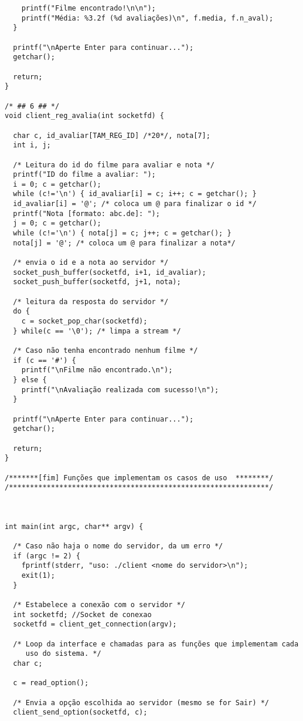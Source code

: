 \documentclass[11pt,twoside]{article}
\begin{document}
\begin{verbatim}
    printf("Filme encontrado!\n\n");
    printf("Média: %3.2f (%d avaliações)\n", f.media, f.n_aval);
  }

  printf("\nAperte Enter para continuar...");
  getchar();

  return;
}

/* ## 6 ## */
void client_reg_avalia(int socketfd) {

  char c, id_avaliar[TAM_REG_ID] /*20*/, nota[7];
  int i, j;

  /* Leitura do id do filme para avaliar e nota */
  printf("ID do filme a avaliar: ");
  i = 0; c = getchar();
  while (c!='\n') { id_avaliar[i] = c; i++; c = getchar(); }
  id_avaliar[i] = '@'; /* coloca um @ para finalizar o id */
  printf("Nota [formato: abc.de]: ");
  j = 0; c = getchar();
  while (c!='\n') { nota[j] = c; j++; c = getchar(); }
  nota[j] = '@'; /* coloca um @ para finalizar a nota*/

  /* envia o id e a nota ao servidor */
  socket_push_buffer(socketfd, i+1, id_avaliar);
  socket_push_buffer(socketfd, j+1, nota);

  /* leitura da resposta do servidor */
  do {
    c = socket_pop_char(socketfd);
  } while(c == '\0'); /* limpa a stream */
  
  /* Caso não tenha encontrado nenhum filme */
  if (c == '#') {
    printf("\nFilme não encontrado.\n");
  } else {
    printf("\nAvaliação realizada com sucesso!\n");
  }

  printf("\nAperte Enter para continuar...");
  getchar();

  return;
}

/*******[fim] Funções que implementam os casos de uso  ********/
/**************************************************************/



int main(int argc, char** argv) {

  /* Caso não haja o nome do servidor, da um erro */
  if (argc != 2) {
    fprintf(stderr, "uso: ./client <nome do servidor>\n");
    exit(1);
  }
	
  /* Estabelece a conexão com o servidor */
  int socketfd; //Socket de conexao
  socketfd = client_get_connection(argv);

  /* Loop da interface e chamadas para as funções que implementam cada 
     uso do sistema. */
  char c;
		
  c = read_option();
    
  /* Envia a opção escolhida ao servidor (mesmo se for Sair) */
  client_send_option(socketfd, c);


\end{verbatim}
\end{document}
